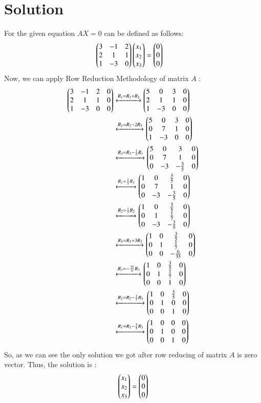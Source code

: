 \documentclass[journal,12pt,twocolumn]{IEEEtran}
\begin{document}
\section{\textbf{Solution}}
For the given equation $AX = 0$ can be defined as follows:
\begin{align}\label{eq_1}
    \begin{pmatrix}3 & -1 & 2 \\
                2 & 1 & 1 \\
                1 & -3 & 0\end{pmatrix}
    \begin{pmatrix}x_1 \\ x_2 \\ x_3\end{pmatrix} &=
    \begin{pmatrix}0 \\ 0 \\ 0\end{pmatrix}
\end{align}
Now, we can apply Row Reduction Methodology of matrix $A$ :
\begin{align}
\begin{pmatrix}3&-1&2&0\\2&1&1&0\\1&-3&0&0\end{pmatrix} 
&\xleftrightarrow{R_1 
= R_1+R_2}\begin{pmatrix}5&0&3&0\\2&1&1&0\\1&-3&0&0\end{pmatrix}\\
&\xleftrightarrow{R_2 = R_2-2R_3}\begin{pmatrix}5&0&3&0\\0&7&1&0\\1&-3&0&0\end{pmatrix}\\
&\xleftrightarrow{R_3 = 
R_3 -\frac{1}{5}R_1}\begin{pmatrix}5&0&3&0\\0&7&1&0\\0&-3&-\frac{3}{5}&0\end{pmatrix}\\
&\xleftrightarrow{R_1 =  \frac{1}{5}R_1}\begin{pmatrix}1&0&\frac{3}{5}&0\\0&7&1&0\\0&-3&-\frac{3}{5}&0\end{pmatrix}\\
&\xleftrightarrow{R_2 = \frac{1}{7}R_2}\begin{pmatrix}1&0&\frac{3}{5}&0\\0&1&\frac{1}{7}&0\\0&-3&-\frac{3}{5}&0\end{pmatrix}\\
&\xleftrightarrow{R_3 = R_3 + 3R_2}\begin{pmatrix}1&0&\frac{3}{5}&0\\0&1&\frac{1}{7}&0\\0&0&-\frac{6}{35}&0\end{pmatrix}\\
&\xleftrightarrow{R_3 = -\frac{35}{6} R_3}\begin{pmatrix}1&0&\frac{3}{5}&0\\0&1&\frac{1}{7}&0\\0&0&1&0\end{pmatrix} \\
&\xleftrightarrow{R_2 = R_2 - \frac{1}{7} R_3}\begin{pmatrix}1&0&\frac{3}{5}&0\\0&1&0&0\\0&0&1&0\end{pmatrix} \\
&\xleftrightarrow{R_1 = R_1 - \frac{3}{5} R_3}\begin{pmatrix}1&0&0&0\\0&1&0&0\\0&0&1&0\end{pmatrix} 
\end{align} 
So, as we can see the only solution we got after row reducing of matrix $A$ is zero vector.
Thus, the solution is :
\begin{align}
    \begin{pmatrix}x_1 \\ x_2 \\ x_3\end{pmatrix} = \begin{pmatrix}0 \\ 0 \\ 0\end{pmatrix}
\end{align}
\end{document}
